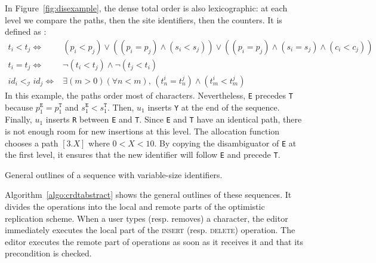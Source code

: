 In Figure~\ref{fig:disexample}, the dense total order is also lexicographic: at
each level we compare the paths, then the site identifiers, then the
counters. It is defined as :
\begin{align*}
  t_i < t_j \iff & (p_i < p_j) \vee  %
                  ((p_i = p_j) \wedge (s_i<s_j)) \vee %
                  ((p_i = p_j) \wedge (s_i = s_j) \wedge (c_i < c_j)) \\
  t_i = t_j \iff & \neg (t_i < t_j) \wedge \neg (t_j < t_i) \\
  id_i <_\mathcal{I} id_j \iff & \exists (m > 0)(\forall n < m),\, (t^i_n = t^j_n) \wedge                             (t^i_m < t^j_m) %
\end{align*}
In this example, the paths order most of characters. Nevertheless, \texttt{E}
precedes \texttt{T} because $p^\texttt{E}_1=p^\texttt{T}_1$ and
$s^\texttt{E}_1 < s^\texttt{T}_1$. Then, $u_1$ inserts \texttt{Y} at the end of
the sequence. Finally, $u_1$ inserts \texttt{R} between \texttt{E} and
\texttt{T}. Since \texttt{E} and \texttt{T} have an identical path, there is not
enough room for new insertions at this level. The allocation function chooses a
path $[3.X]$ where $0<X<10$. By copying the disambiguator of \texttt{E} at the
first level, it ensures that the new identifier will follow \texttt{E} and
precede \texttt{T}.


\begin{algorithm}
  
  \caption{\label{algo:crdtabstract}General outlines of a sequence with
    variable-size identifiers.}
\end{algorithm}


Algorithm~\ref{algo:crdtabstract} shows the general outlines of these
sequences. It divides the operations into the local and remote parts of the
optimistic replication scheme. When a user types (resp. removes) a character,
the editor immediately executes the local part of the \textsc{insert}
(resp. \textsc{delete}) operation. The editor executes the remote part of
operations as soon as it receives it and that its precondition is checked.

